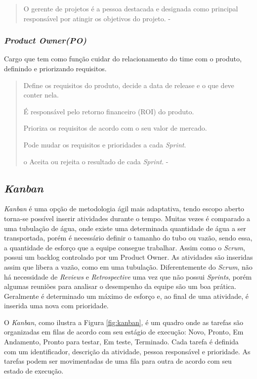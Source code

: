 \begin{quote}
  O gerente de projetos é a pessoa destacada e designada como principal responsável por atingir os objetivos do projeto. - \cite{cruz2013scrum}
\end{quote}
\subsubsection{\textit{Product Owner(PO)}}
\label{sec:po}
Cargo que tem como função cuidar do relacionamento do time com o produto,
 definindo e priorizando requisitos.
 
 \begin{quote}
  Define os requisitos do
  produto, decide a data de
  release e o que deve conter
  nela.

  É responsável pelo retorno
  financeiro (ROI) do produto.
  
  Prioriza os requisitos de
  acordo com o seu valor de
  mercado.
  
  Pode mudar os requisitos e
  prioridades a cada \textit{Sprint}.

  o Aceita ou rejeita o resultado de
  cada \textit{Sprint}. - \cite{sabbagh2014scrum}
 \end{quote}

\subsection{\textit{Kanban}}
\textit{Kanban} é uma opção de metodologia ágil mais adaptativa, tendo escopo aberto torna-se possível inserir atividades durante o tempo.
Muitas vezes é comparado a uma tubulação de água, onde existe uma determinada quantidade de água a ser transportada, porém é necessário definir o tamanho do tubo ou vazão, sendo essa, a quantidade de esforço que a equipe consegue trabalhar.
Assim como o \textit{Scrum}, possui um backlog controlado por um Product Owner. As atividades são inseridas assim que libera a vazão, como em uma tubulação.
Diferentemente do \textit{Scrum}, não há necessidade de \textit{Reviews} e \textit{Retrospective} uma vez que não possui \textit{Sprints}, porém algumas reuniões para analisar o desempenho da equipe são um boa prática.
Geralmente é determinado um máximo de esforço e, ao final de uma atividade, é inserida uma nova com prioridade.

O \textit{Kanban}, como ilustra a Figura \ref{fig:kanban}, é um quadro onde as tarefas são organizadas em filas de acordo com seu estágio de execução: Novo, Pronto, Em Andamento, Pronto para testar, Em teste, Terminado.
Cada  tarefa é definida com um identificador, descrição da atividade, pessoa responsável e prioridade. As tarefas podem ser movimentadas de uma fila para outra de acordo com seu estado de execução.

